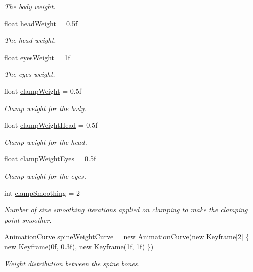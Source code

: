 \begin{DoxyCompactItemize}
\begin{DoxyCompactList}\small\item\em The body weight. \end{DoxyCompactList}\item 
float \mbox{\hyperlink{class_root_motion_1_1_final_i_k_1_1_i_k_solver_look_at_a81105cdff06d5efcc81b7052570fef23}{head\+Weight}} = 0.\+5f
\begin{DoxyCompactList}\small\item\em The head weight. \end{DoxyCompactList}\item 
float \mbox{\hyperlink{class_root_motion_1_1_final_i_k_1_1_i_k_solver_look_at_a8ba8c5444746a73418df26ed95bc354e}{eyes\+Weight}} = 1f
\begin{DoxyCompactList}\small\item\em The eyes weight. \end{DoxyCompactList}\item 
float \mbox{\hyperlink{class_root_motion_1_1_final_i_k_1_1_i_k_solver_look_at_ab3250b9d745f18606490c0dac5c3ce1f}{clamp\+Weight}} = 0.\+5f
\begin{DoxyCompactList}\small\item\em Clamp weight for the body. \end{DoxyCompactList}\item 
float \mbox{\hyperlink{class_root_motion_1_1_final_i_k_1_1_i_k_solver_look_at_a19869820d56d9db9ca76e64db0b7a90b}{clamp\+Weight\+Head}} = 0.\+5f
\begin{DoxyCompactList}\small\item\em Clamp weight for the head. \end{DoxyCompactList}\item 
float \mbox{\hyperlink{class_root_motion_1_1_final_i_k_1_1_i_k_solver_look_at_a2068a358e6dd49f28681cb34da4e698c}{clamp\+Weight\+Eyes}} = 0.\+5f
\begin{DoxyCompactList}\small\item\em Clamp weight for the eyes. \end{DoxyCompactList}\item 
int \mbox{\hyperlink{class_root_motion_1_1_final_i_k_1_1_i_k_solver_look_at_a19dceb41f8d8daaceaefee0e7a9fa04e}{clamp\+Smoothing}} = 2
\begin{DoxyCompactList}\small\item\em Number of sine smoothing iterations applied on clamping to make the clamping point smoother. \end{DoxyCompactList}\item 
Animation\+Curve \mbox{\hyperlink{class_root_motion_1_1_final_i_k_1_1_i_k_solver_look_at_a971a286cc06a406e4119f36c988090ca}{spine\+Weight\+Curve}} = new Animation\+Curve(new Keyframe\mbox{[}2\mbox{]} \{ new Keyframe(0f, 0.\+3f), new Keyframe(1f, 1f) \})
\begin{DoxyCompactList}\small\item\em Weight distribution between the spine bones. \end{DoxyCompactList}\end{DoxyCompactItemize}
